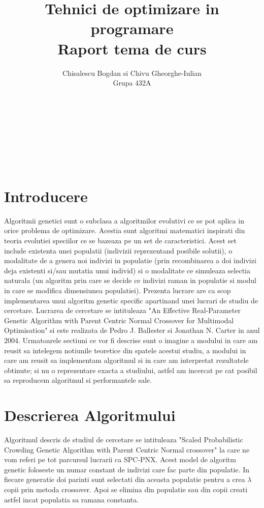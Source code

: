 \documentclass[a4paper]{article}
\title{\huge Tehnici de optimizare in programare
\\Raport tema de curs
}
\author{Chisalescu Bogdan  si  Chivu Gheorghe-Iulian
\\ Grupa 432A
}
\date{}
\begin{document}
\maketitle
\vphantom{} \\ \\ \\ \\ \\
\section{Introducere}
\Large 
Algoritmii genetici sunt o subclasa a algoritmilor evolutivi ce se pot aplica in orice problema de optimizare. Acestia sunt algoritmi matematici inspirati din teoria evolutiei speciilor ce se bazeaza pe un set de caracteristici. Acest set include existenta unei populatii (indivizii reprezentand posibile solutii), o modalitate de a genera noi indivizi in populatie (prin recombinarea a doi indivizi deja existenti si/sau mutatia unui individ) si o modalitate ce simuleaza selectia naturala (un algoritm prin care se decide ce indivizi raman in populatie si modul in care se modifica dimensiunea populatiei).
\newline
Prezenta lucrare are ca scop implementarea unui algoritm genetic specific apartinand unei lucrari de studiu de cercetare. Lucrarea de cercetare se intituleaza "An Effective Real-Parameter Genetic Algorithm with Parent Centric Normal Crossover for Multimodal Optimisation" si este realizata de Pedro J. Ballester si Jonathan N. Carter in anul 2004. 
\newline
Urmatoarele sectiuni ce vor fi descrise sunt o imagine a modului in care am reusit sa intelegem notiunile teoretice din spatele acestui studiu, a modului in care am reusit sa implementam algoritmul si in care am interpretat rezultatele obtinute; si nu o reprezentare exacta a studiului, astfel am incercat pe cat posibil sa reproducem algoritmul si performantele sale.
\newpage

\section{Descrierea Algoritmului}
Algoritmul descris de studiul de cercetare se intituleaza "Scaled Probabilistic Crowding Genetic Algorithm with Parent Centric Normal crossover" la care ne vom referi pe tot parcursul lucrarii ca SPC-PNX. 
\newline
Acest model de algoritm genetic foloseste un numar constant de indivizi care fac parte din populatie. In fiecare generatie doi parinti sunt selectati din aceasta populatie pentru a crea $\lambda$ copii prin metoda crossover. Apoi se elimina din populatie sau din copii creati astfel incat populatia sa ramana constanta. 
\end{document}
